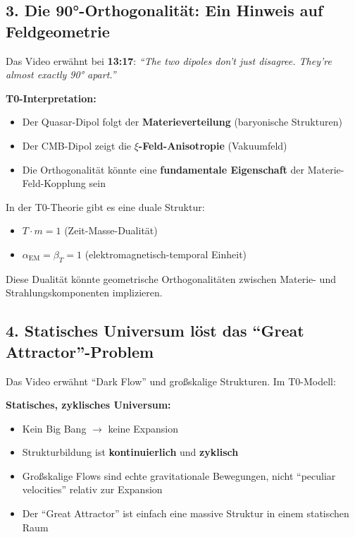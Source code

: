 \documentclass{article}
\begin{document}
	\subsection{3. Die 90°-Orthogonalit{\"a}t: Ein Hinweis auf Feldgeometrie}
	
	Das Video erw{\"a}hnt bei \textbf{13:17}: \textit{``The two dipoles don't just disagree. They're almost exactly 90° apart.''} \cite{secrest2024}
	
	\textbf{T0-Interpretation:}
	\begin{itemize}
		\item Der Quasar-Dipol folgt der \textbf{Materieverteilung} (baryonische Strukturen)
		\item Der CMB-Dipol zeigt die \textbf{$\xi$-Feld-Anisotropie} (Vakuumfeld)
		\item Die Orthogonalit{\"a}t k{\"o}nnte eine \textbf{fundamentale Eigenschaft} der Materie-Feld-Kopplung sein
	\end{itemize}
	
	In der T0-Theorie gibt es eine duale Struktur:
	\begin{itemize}
		\item $T \cdot m = 1$ (Zeit-Masse-Dualit{\"a}t)
		\item $\alpha_{\text{EM}} = \beta_T = 1$ (elektromagnetisch-temporal Einheit)
	\end{itemize}
	
	Diese Dualit{\"a}t k{\"o}nnte geometrische Orthogonalit{\"a}ten zwischen Materie- und Strahlungskomponenten implizieren.
	
	\subsection{4. Statisches Universum l{\"o}st das ``Great Attractor''-Problem}
	
	Das Video erw{\"a}hnt ``Dark Flow'' und gro{\ss}skalige Strukturen. Im T0-Modell:
	
	\textbf{Statisches, zyklisches Universum:}
	\begin{itemize}
		\item Kein Big Bang $\rightarrow$ keine Expansion
		\item Strukturbildung ist \textbf{kontinuierlich} und \textbf{zyklisch}
		\item Gro{\ss}skalige Flows sind echte gravitationale Bewegungen, nicht ``peculiar velocities'' relativ zur Expansion
		\item Der ``Great Attractor'' ist einfach eine massive Struktur in einem statischen Raum
	\end{itemize}
	
\end{document}
